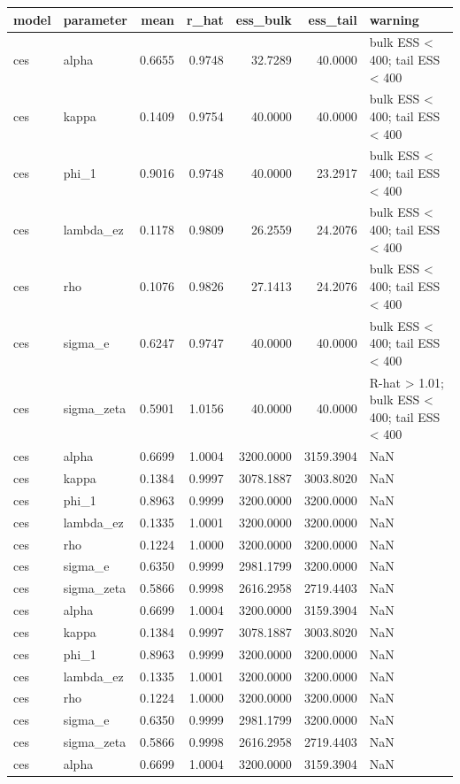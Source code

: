 \begin{tabular}{llrrrrl}
\toprule
model & parameter & mean & r\_hat & ess\_bulk & ess\_tail & warning \\
\midrule
ces & alpha & 0.6655 & 0.9748 & 32.7289 & 40.0000 & bulk ESS < 400; tail ESS < 400 \\
ces & kappa & 0.1409 & 0.9754 & 40.0000 & 40.0000 & bulk ESS < 400; tail ESS < 400 \\
ces & phi\_1 & 0.9016 & 0.9748 & 40.0000 & 23.2917 & bulk ESS < 400; tail ESS < 400 \\
ces & lambda\_ez & 0.1178 & 0.9809 & 26.2559 & 24.2076 & bulk ESS < 400; tail ESS < 400 \\
ces & rho & 0.1076 & 0.9826 & 27.1413 & 24.2076 & bulk ESS < 400; tail ESS < 400 \\
ces & sigma\_e & 0.6247 & 0.9747 & 40.0000 & 40.0000 & bulk ESS < 400; tail ESS < 400 \\
ces & sigma\_zeta & 0.5901 & 1.0156 & 40.0000 & 40.0000 & R-hat > 1.01; bulk ESS < 400; tail ESS < 400 \\
ces & alpha & 0.6699 & 1.0004 & 3200.0000 & 3159.3904 & NaN \\
ces & kappa & 0.1384 & 0.9997 & 3078.1887 & 3003.8020 & NaN \\
ces & phi\_1 & 0.8963 & 0.9999 & 3200.0000 & 3200.0000 & NaN \\
ces & lambda\_ez & 0.1335 & 1.0001 & 3200.0000 & 3200.0000 & NaN \\
ces & rho & 0.1224 & 1.0000 & 3200.0000 & 3200.0000 & NaN \\
ces & sigma\_e & 0.6350 & 0.9999 & 2981.1799 & 3200.0000 & NaN \\
ces & sigma\_zeta & 0.5866 & 0.9998 & 2616.2958 & 2719.4403 & NaN \\
ces & alpha & 0.6699 & 1.0004 & 3200.0000 & 3159.3904 & NaN \\
ces & kappa & 0.1384 & 0.9997 & 3078.1887 & 3003.8020 & NaN \\
ces & phi\_1 & 0.8963 & 0.9999 & 3200.0000 & 3200.0000 & NaN \\
ces & lambda\_ez & 0.1335 & 1.0001 & 3200.0000 & 3200.0000 & NaN \\
ces & rho & 0.1224 & 1.0000 & 3200.0000 & 3200.0000 & NaN \\
ces & sigma\_e & 0.6350 & 0.9999 & 2981.1799 & 3200.0000 & NaN \\
ces & sigma\_zeta & 0.5866 & 0.9998 & 2616.2958 & 2719.4403 & NaN \\
ces & alpha & 0.6699 & 1.0004 & 3200.0000 & 3159.3904 & NaN \\

\end{tabular}
